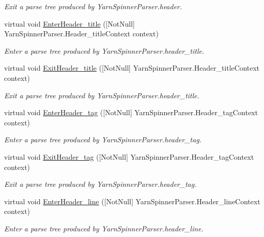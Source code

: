 \begin{DoxyCompactItemize}
\begin{DoxyCompactList}\small\item\em Exit a parse tree produced by Yarn\-Spinner\-Parser.\-header. \end{DoxyCompactList}\item 
virtual void \hyperlink{a00190_a534afa69b1205e9e5a5d1684f3efccf8}{Enter\-Header\-\_\-title} (\mbox{[}Not\-Null\mbox{]} Yarn\-Spinner\-Parser.\-Header\-\_\-title\-Context context)
\begin{DoxyCompactList}\small\item\em Enter a parse tree produced by Yarn\-Spinner\-Parser.\-header\-\_\-title. \end{DoxyCompactList}\item 
virtual void \hyperlink{a00190_aa6b04ccce84fc37c85731c8d0ab60d1c}{Exit\-Header\-\_\-title} (\mbox{[}Not\-Null\mbox{]} Yarn\-Spinner\-Parser.\-Header\-\_\-title\-Context context)
\begin{DoxyCompactList}\small\item\em Exit a parse tree produced by Yarn\-Spinner\-Parser.\-header\-\_\-title. \end{DoxyCompactList}\item 
virtual void \hyperlink{a00190_a7e46ec306ac8412b4f300aec4c3a6a7c}{Enter\-Header\-\_\-tag} (\mbox{[}Not\-Null\mbox{]} Yarn\-Spinner\-Parser.\-Header\-\_\-tag\-Context context)
\begin{DoxyCompactList}\small\item\em Enter a parse tree produced by Yarn\-Spinner\-Parser.\-header\-\_\-tag. \end{DoxyCompactList}\item 
virtual void \hyperlink{a00190_a6d2ef3bda1ff771ae9bf39b2842b1f69}{Exit\-Header\-\_\-tag} (\mbox{[}Not\-Null\mbox{]} Yarn\-Spinner\-Parser.\-Header\-\_\-tag\-Context context)
\begin{DoxyCompactList}\small\item\em Exit a parse tree produced by Yarn\-Spinner\-Parser.\-header\-\_\-tag. \end{DoxyCompactList}\item 
virtual void \hyperlink{a00190_a7d7c66a57f3b9621cec9eafa103f4a92}{Enter\-Header\-\_\-line} (\mbox{[}Not\-Null\mbox{]} Yarn\-Spinner\-Parser.\-Header\-\_\-line\-Context context)
\begin{DoxyCompactList}\small\item\em Enter a parse tree produced by Yarn\-Spinner\-Parser.\-header\-\_\-line. \end{DoxyCompactList}\item 

\end{DoxyCompactItemize}
